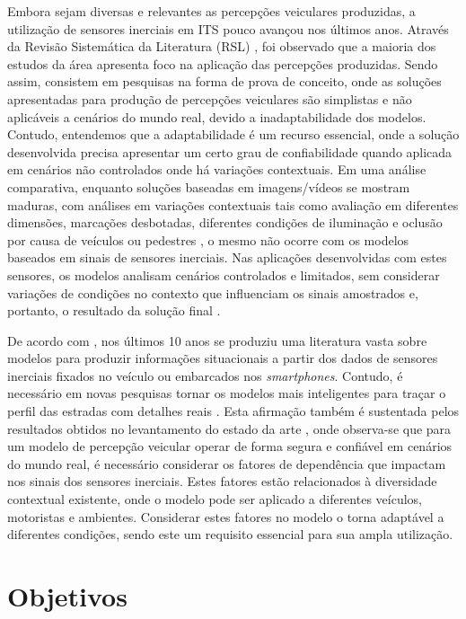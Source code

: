 Embora sejam diversas e relevantes as percepções veiculares produzidas, a utilização de sensores inerciais em ITS pouco avançou nos últimos anos. Através da Revisão Sistemática da Literatura (RSL) \cite{menegazzo2018,menegazzo2020}, foi observado que a maioria dos estudos da área apresenta foco na aplicação das percepções produzidas. Sendo assim, consistem em pesquisas na forma de prova de conceito, onde as soluções apresentadas para produção de percepções veiculares são simplistas e não aplicáveis a cenários do mundo real, devido a inadaptabilidade dos modelos. Contudo, entendemos que a adaptabilidade é um recurso essencial, onde a solução desenvolvida precisa apresentar um certo grau de confiabilidade quando aplicada em cenários não controlados onde há variações contextuais. Em uma análise comparativa, enquanto soluções baseadas em imagens/vídeos se mostram maduras, com análises em variações contextuais tais como avaliação em diferentes dimensões, marcações desbotadas, diferentes condições de iluminação e oclusão por causa de veículos ou pedestres \cite{Srimongkon2017, Patil2020}, o mesmo não ocorre com os modelos baseados em sinais de sensores inerciais. Nas aplicações desenvolvidas com estes sensores, os modelos analisam cenários controlados e limitados, sem considerar variações de condições no contexto que influenciam os sinais amostrados e, portanto, o resultado da solução final \cite{menegazzo2018,menegazzo2020}.

De acordo com , nos últimos 10 anos se produziu uma literatura vasta sobre modelos para produzir informações situacionais a partir dos dados de sensores inerciais fixados no veículo ou embarcados nos \textit{smartphones}. Contudo, é necessário em novas pesquisas tornar os modelos mais inteligentes para traçar o perfil das estradas com detalhes reais \cite{Carlos2019}. Esta afirmação também é sustentada pelos resultados obtidos no levantamento do estado da arte \cite{menegazzo2018,menegazzo2020}, onde observa-se que para um modelo de percepção veicular operar de forma segura e confiável em cenários do mundo real, é necessário considerar os fatores de dependência que impactam nos sinais dos sensores inerciais. Estes fatores estão relacionados à diversidade contextual existente, onde o modelo pode ser aplicado a diferentes veículos, motoristas e ambientes. Considerar estes fatores no modelo o torna adaptável a diferentes condições, sendo este um requisito essencial para sua ampla utilização.

\section{Objetivos}

